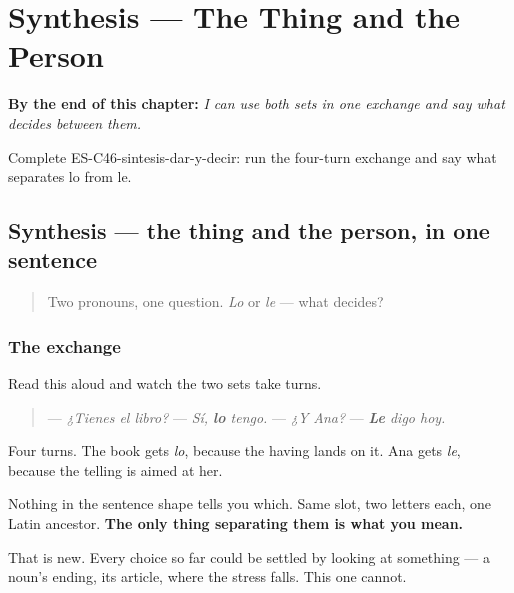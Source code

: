 
\chapter{Synthesis --- The Thing and the Person}
\label{ch:synthesis-two-sets}

\begin{chapteropening}
\textbf{By the end of this chapter:} \emph{I can use both sets in one exchange and say what decides between them.}

Complete ES-C46-sintesis-dar-y-decir: run the four-turn exchange and say what separates lo from le.
\end{chapteropening}

\section[Practice]{Synthesis — the thing and the person, in one sentence}

\label{lesson:ES-C46-sintesis-dar-y-decir}



\begin{quote}
Two pronouns, one question. \emph{Lo} or \emph{le} — what decides?
\end{quote}

\subsection*{The exchange}
Read this aloud and watch the two sets take turns.

\begin{quote}
— \emph{¿Tienes el libro?} — \emph{Sí, \textbf{lo} tengo.} — \emph{¿Y Ana?} — \emph{\textbf{Le} digo hoy.}
\end{quote}

Four turns. The book gets \emph{lo}, because the having lands on it. Ana gets \emph{le}, because the telling is aimed at her.

Nothing in the sentence shape tells you which. Same slot, two letters each, one Latin ancestor. \textbf{The only thing separating them is what you mean.}

That is new. Every choice so far could be settled by looking at something — a noun's ending, its article, where the stress falls. This one cannot.

